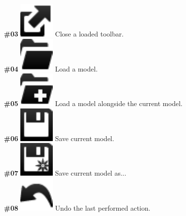 \documentclass{article}
\numberwithin{equation}{section}
\numberwithin{figure}{section}
\begin{document}
\textbf{\#03} \hspace*{1cm}
\includegraphics[scale=0.5]{figures/icon_dropToolbar} \hspace*{1cm}
Close a loaded toolbar.\\

\textbf{\#04} \hspace*{1cm}
\includegraphics[scale=0.5]{figures/icon_loadModel} \hspace*{1cm}
Load a model.\\

\textbf{\#05} \hspace*{1cm}
\includegraphics[scale=0.5]{figures/icon_insertModel} \hspace*{1cm}
Load a model alongside the current model.\\

\textbf{\#06} \hspace*{1cm}
\includegraphics[scale=0.5]{figures/icon_saveModel} \hspace*{1cm}
Save current model.\\

\textbf{\#07} \hspace*{1cm}
\includegraphics[scale=0.5]{figures/icon_saveModelAs} \hspace*{1cm}
Save current model as...\\

\textbf{\#08} \hspace*{1cm}
\includegraphics[scale=0.5]{figures/icon_undo} \hspace*{1cm}
Undo the last performed action.\\
\end{document}

